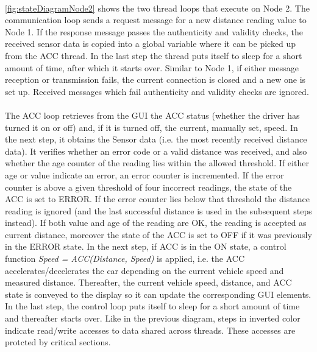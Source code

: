 \paragraph{}
\ref{fig:stateDiagramNode2} shows the two thread loops that execute on Node 2. The communication loop sends a request message for a new distance reading value to Node 1. If the response message passes the authenticity and validity checks, the received sensor data is copied into a global variable where it can be picked up from the ACC thread. In the last step the thread puts itself to sleep for a short amount of time, after which it starts over. Similar to Node 1, if either message reception or transmission fails, the current connection is closed and a new one is set up. Received messages which fail authenticity and validity checks are ignored.

\paragraph{}
The ACC loop retrieves from the GUI the ACC status (whether the driver has turned it on or off) and, if it is turned off, the current, manually set, speed. In the next step, it obtains the Sensor data (i.e. the most recently received distance data). It verifies whether an error code or a valid distance was received, and also whether the age counter of the reading lies within the allowed threshold. If either age or value indicate an error, an error counter is incremented. If the error counter is above a given threshold of four incorrect readings, the state of the ACC is set to ERROR. If the error counter lies below that threshold the distance reading is ignored (and the last successful distance is used in the subsequent steps instead). If both value and age of the reading are OK, the reading is accepted as current distance, moreover the state of the ACC is set to OFF if it was previously in the ERROR state.
In the next step, if ACC is in the ON state, a control function \emph{Speed = ACC(Distance, Speed)} is applied, i.e. the ACC accelerates/decelerates the car depending on the current vehicle speed and measured distance.
Thereafter, the current vehicle speed, distance, and ACC state is conveyed to the display so it can update the corresponding GUI elements. In the last step, the control loop puts itself to sleep for a short amount of time and thereafter starts over. Like in the previous diagram, steps in inverted color indicate read/write accesses to data shared across threads. These accesses are protcted by critical sections.

